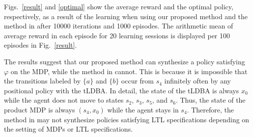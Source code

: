 \documentclass[a4j,12pt,oneside,openany,english,dvipdfmx]{jsbook}
\begin{document}
Figs.\ \ref{result} and \ref{optimal} show the average reward and the optimal policy, respectively, as a result of the learning when using our proposed method and the method in \cite{HAK2019} after 10000 iterations and 1000 episodes. The arithmetic mean of average reward in each episode for 20 learning sessions is displayed per 100 episodes in Fig.\ \ref{result}.

The results suggest that our proposed method can synthesize a policy satisfying $\varphi$ on the MDP, while the method in \cite{HAK2019} cannot. This is because it is impossible that the transitions labeled by $\{ a \}$ and $\{ b \}$ occur from $s_4$ infinitely often by any positional policy with the tLDBA. In detail, the state of the tLDBA is always $x_0$ while the agent does not move to states $s_2$, $s_3$, $s_5$, and $s_6$. Thus, the state of the product MDP is always $(s_4, x_0)$ while the agent stays in $s_4$. Therefore, the method in \cite{HAK2019} may not synthesize policies satisfying LTL specifications depending on the setting of MDPs or LTL specifications.
\end{document}
